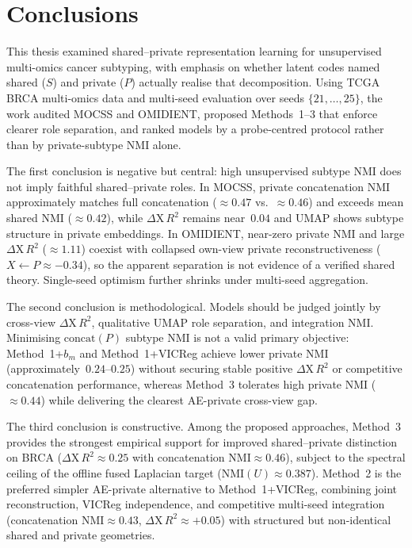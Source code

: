 \clearpage
\section{Conclusions}
\label{sec:conclusions}

This thesis examined shared--private representation learning for unsupervised multi-omics cancer subtyping, with emphasis on whether latent codes named shared ($S$) and private ($P$) actually realise that decomposition. Using TCGA BRCA multi-omics data and multi-seed evaluation over seeds $\{21,\ldots,25\}$, the work audited MOCSS and OMIDIENT, proposed Methods~1--3 that enforce clearer role separation, and ranked models by a probe-centred protocol rather than by private-subtype NMI alone.

The first conclusion is negative but central: high unsupervised subtype NMI does not imply faithful shared--private roles. In MOCSS, private concatenation NMI approximately matches full concatenation ($\approx0.47$ vs.\ $\approx0.46$) and exceeds mean shared NMI ($\approx0.42$), while $\Delta\mathrm{X}\,R^{2}$ remains near~$0.04$ and UMAP shows subtype structure in private embeddings. In OMIDIENT, near-zero private NMI and large $\Delta\mathrm{X}\,R^{2}$ ($\approx1.11$) coexist with collapsed own-view private reconstructiveness ($X\leftarrow P\approx-0.34$), so the apparent separation is not evidence of a verified shared theory. Single-seed optimism further shrinks under multi-seed aggregation.

The second conclusion is methodological. Models should be judged jointly by cross-view $\Delta\mathrm{X}\,R^{2}$, qualitative UMAP role separation, and integration NMI. Minimising $\mathrm{concat}(P)$ subtype NMI is not a valid primary objective: Method~1+$b_m$ and Method~1+VICReg achieve lower private NMI (approximately~$0.24$--$0.25$) without securing stable positive $\Delta\mathrm{X}\,R^{2}$ or competitive concatenation performance, whereas Method~3 tolerates high private NMI ($\approx0.44$) while delivering the clearest AE-private cross-view gap.

The third conclusion is constructive. Among the proposed approaches, Method~3 provides the strongest empirical support for improved shared--private distinction on BRCA ($\Delta\mathrm{X}\,R^{2}\approx0.25$ with concatenation NMI$\approx0.46$), subject to the spectral ceiling of the offline fused Laplacian target ($\mathrm{NMI}(U)\approx0.387$). Method~2 is the preferred simpler AE-private alternative to Method~1+VICReg, combining joint reconstruction, VICReg independence, and competitive multi-seed integration (concatenation NMI$\approx0.43$, $\Delta\mathrm{X}\,R^{2}\approx+0.05$) with structured but non-identical shared and private geometries.

